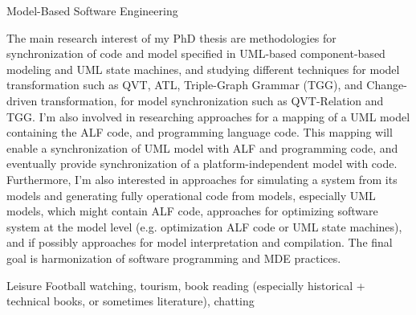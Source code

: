 \begin{cventries}
\cvinterest
{Model-Based Software Engineering}
{
	\begin{cvitems}
	\item{The main research interest of my PhD thesis are methodologies for synchronization of code and model specified in UML-based component-based modeling and UML state machines, and studying different techniques for model transformation such as QVT, ATL, Triple-Graph Grammar (TGG), and Change-driven transformation, for model synchronization such as QVT-Relation and TGG.	
I'm also involved in researching approaches for a mapping of a UML model containing the ALF code, and programming language code.
This mapping will enable a synchronization of UML model with ALF and programming code, and eventually provide synchronization of a platform-independent model with code.
Furthermore, I'm also interested in approaches for simulating a system from its models and generating fully operational code from models, especially UML models, which might contain ALF code, approaches for optimizing software system at the model level (e.g. optimization ALF code or UML state machines), and if possibly approaches for model interpretation and compilation.
The final goal is harmonization of software programming and MDE practices.}
\end{cvitems}}


\cvinterest
{Leisure}
{Football watching, tourism, book reading (especially historical + technical books, or sometimes literature), chatting}

\begin{comment}
\cvinterest
{Model-Driven Engineering with Large Models}
{
	\begin{cvitems}
		\item {I have been working with Papyrus UML models during my thesis for generating real case-study embedded systems, e.g. 12000 lines of code generated for the Lego Car factory case study. When models become large, the processing of the models, e.g. querying and loading for model transformations, becomes very slow, which might harms the adoption of modeling techniques to industrial development. For this, I'm very interested in studying techniques for speeding model manipulations up such as incremental model query with IncQuery or the PrefetchML prefetching and caching language for caching models.}
	\end{cvitems}
}
\end{comment}


\end{cventries}

